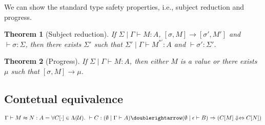 \message{ !name(main.tex)}\documentclass[acmsmall, nonacm, review]{acmart}
\theoremstyle{plain}
\newtheorem{thm}{Theorem}[section]
\theoremstyle{definition}
\theoremstyle{remark}
\begin{document}
We can show the standard type safety properties, i.e., subject reduction and progress.
\begin{thm}[Subject reduction]
  If $\Sigma\mid\Gamma \vdash M : A$, $[\sigma,M] \to [\sigma',M']$ and $\vdash \sigma : \Sigma$,
  then there exists $\Sigma'$ such that $\Sigma' \mid \Gamma \vdash M^{*'} : A$ and $\vdash \sigma' : \Sigma'$.
\end{thm}

\begin{thm}[Progress]
  If $\Sigma \mid \Gamma \vdash M : A$,
  then either $M$ is a value or there exists $\mu$ such that $[\sigma,M] \to \mu$.

\end{thm}

\subsection{Contetual equivalence}

\begin{equation}
  \Gamma \vdash M \approx N : A = \forall C[\cdot] \in \Lambda(\mathcal{U}).\ \vdash C : (\emptyset\mid\Gamma \vdash A)\doublerightarrow (\emptyset\mid\epsilon\vdash B) \Rightarrow (C[M]\Downarrow \Leftrightarrow C[N])
\end{equation}

\end{document}
